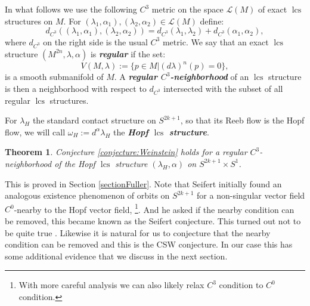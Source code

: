 \documentclass{amsart}
\numberwithin{equation}{section}
\newtheorem{theorem}[equation]{Theorem}
\theoremstyle{definition}
\theoremstyle{remark}
\DeclareMathOperator{\lcs}{lcs}
\begin{document}
In what follows we use the following $C ^{3}$ metric on the space $\mathcal{L} (M) $ of exact $\lcs$ structures on $M$. For $(\lambda _{1}, \alpha _{1}), (\lambda _{2}, \alpha _{2}) \in \mathcal{L} (M)$ define:
\begin{equation*}
   d _{C ^{3}}  ((\lambda _{1}, \alpha _{1}), (\lambda _{2}, \alpha _{2})) = d _{C ^{3} } (\lambda _{1}, \lambda _{2}  )  + d _{C ^{3}} (\alpha _{1}, \alpha _{2}  ),
\end{equation*}
where $d _{C ^{3}} $ on the right side is the usual $C ^{3} $ metric. We say that an exact $\lcs$ structure $(M ^{2n}, \lambda, \alpha)$ is \textbf{\emph{regular}} if the set:
\begin{equation*}
  {V} (M, \lambda):= \{p \in M| (d\lambda) ^{n} (p)=0 \},
\end{equation*}
is a smooth submanifold of $M$. A \textbf{\emph{regular $C ^{3} $-neighborhood}} of an $\lcs$ structure is then a neighborhood with respect to $d _{C ^{3} } $ intersected with the subset of all regular $\lcs$ structures.

For $\lambda _{H} $ the standard contact structure on $S ^{2k+1} $, so that its Reeb flow is the Hopf flow, we will call $\omega _{H}:= d ^{\alpha} \lambda _{H}$ 
the \textbf{\emph{Hopf $\lcs$ structure}}.
\begin{theorem} \label{thm:C0Weinstein} 
Conjecture \ref{conjecture:Weinstein} holds for a regular $C ^{3} $-neighborhood of the Hopf $\lcs$ structure $(\lambda _{H}, \alpha)$ on $S ^{2k+1} \times S ^{1}  $.
\end{theorem}
This is proved in Section \ref{sectionFuller}. Note that Seifert \cite{citeSeifert} initially found an analogous existence phenomenon of orbits on $S ^{2k+1} $ for a non-singular vector field $C ^{0} $-nearby to the Hopf vector field, \footnote {With more careful analysis we can also likely relax $C ^{3} $ condition to $C ^{0} $ condition.}. And he asked if the nearby condition can be removed, this became known as the Seifert conjecture. This turned out not to be quite true \cite{citeKuperbergvolumepreserving}.
Likewise it is natural for us to conjecture that the nearby condition can be removed and this is the CSW conjecture. In our case this has some additional evidence that we discuss in the next section.
\end{document}
